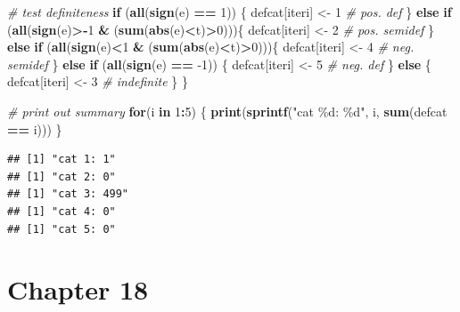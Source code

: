 \documentclass[
]{book}
\newenvironment{Shaded}{\begin{snugshade}}{\end{snugshade}}
\newcommand{\CommentTok}[1]{\textcolor[rgb]{0.56,0.35,0.01}{\textit{#1}}}
\newcommand{\ControlFlowTok}[1]{\textcolor[rgb]{0.13,0.29,0.53}{\textbf{#1}}}
\newcommand{\DecValTok}[1]{\textcolor[rgb]{0.00,0.00,0.81}{#1}}
\newcommand{\KeywordTok}[1]{\textcolor[rgb]{0.13,0.29,0.53}{\textbf{#1}}}
\newcommand{\NormalTok}[1]{#1}
\newcommand{\OperatorTok}[1]{\textcolor[rgb]{0.81,0.36,0.00}{\textbf{#1}}}
\newcommand{\StringTok}[1]{\textcolor[rgb]{0.31,0.60,0.02}{#1}}
\begin{document}
\begin{Shaded}
\begin{Highlighting}[]
  \CommentTok{\# test definiteness}
  \ControlFlowTok{if}\NormalTok{ (}\KeywordTok{all}\NormalTok{(}\KeywordTok{sign}\NormalTok{(e) }\OperatorTok{==}\StringTok{ }\DecValTok{1}\NormalTok{)) \{}
\NormalTok{    defcat[iteri] \textless{}{-}}\StringTok{ }\DecValTok{1} \CommentTok{\# pos. def}
\NormalTok{  \}}
  \ControlFlowTok{else} \ControlFlowTok{if}\NormalTok{ (}\KeywordTok{all}\NormalTok{(}\KeywordTok{sign}\NormalTok{(e)}\OperatorTok{\textgreater{}{-}}\DecValTok{1} \OperatorTok{\&}\StringTok{ }\NormalTok{(}\KeywordTok{sum}\NormalTok{(}\KeywordTok{abs}\NormalTok{(e)}\OperatorTok{\textless{}}\NormalTok{t)}\OperatorTok{\textgreater{}}\DecValTok{0}\NormalTok{)))\{}
\NormalTok{    defcat[iteri] \textless{}{-}}\StringTok{ }\DecValTok{2} \CommentTok{\# pos. semidef}
\NormalTok{  \}}
  \ControlFlowTok{else} \ControlFlowTok{if}\NormalTok{ (}\KeywordTok{all}\NormalTok{(}\KeywordTok{sign}\NormalTok{(e)}\OperatorTok{\textless{}}\DecValTok{1} \OperatorTok{\&}\StringTok{ }\NormalTok{(}\KeywordTok{sum}\NormalTok{(}\KeywordTok{abs}\NormalTok{(e)}\OperatorTok{\textless{}}\NormalTok{t)}\OperatorTok{\textgreater{}}\DecValTok{0}\NormalTok{)))\{}
\NormalTok{    defcat[iteri] \textless{}{-}}\StringTok{ }\DecValTok{4} \CommentTok{\# neg. semidef}
\NormalTok{  \}}
  \ControlFlowTok{else} \ControlFlowTok{if}\NormalTok{ (}\KeywordTok{all}\NormalTok{(}\KeywordTok{sign}\NormalTok{(e) }\OperatorTok{==}\StringTok{ }\DecValTok{{-}1}\NormalTok{)) \{}
\NormalTok{    defcat[iteri] \textless{}{-}}\StringTok{ }\DecValTok{5} \CommentTok{\# neg. def}
\NormalTok{  \}}
  \ControlFlowTok{else}\NormalTok{ \{}
\NormalTok{    defcat[iteri] \textless{}{-}}\StringTok{ }\DecValTok{3} \CommentTok{\# indefinite}
\NormalTok{  \}}
\NormalTok{\}}

\CommentTok{\# print out summary}
\ControlFlowTok{for}\NormalTok{(i }\ControlFlowTok{in} \DecValTok{1}\OperatorTok{:}\DecValTok{5}\NormalTok{)}
\NormalTok{\{}
  \KeywordTok{print}\NormalTok{(}\KeywordTok{sprintf}\NormalTok{(}\StringTok{"cat \%d: \%d"}\NormalTok{, i, }\KeywordTok{sum}\NormalTok{(defcat }\OperatorTok{==}\StringTok{ }\NormalTok{i)))}
\NormalTok{\}}
\end{Highlighting}
\end{Shaded}

\begin{verbatim}
## [1] "cat 1: 1"
## [1] "cat 2: 0"
## [1] "cat 3: 499"
## [1] "cat 4: 0"
## [1] "cat 5: 0"
\end{verbatim}

\hypertarget{chapter-18}{%
\section*{Chapter 18}\label{chapter-18}}
\end{document}
